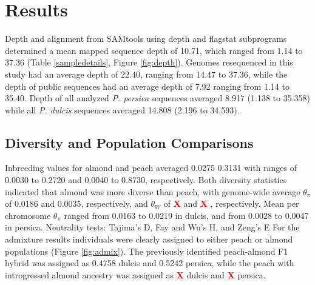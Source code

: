 \documentclass[12pt]{article}
\newcommand{\X}{\textcolor{red}{\bf X }}
\begin{document}
%
%
\section*{Results}

Depth and alignment from SAMtools using depth and flagstat subprograms \citep{li2009sequence} determined a mean mapped sequence depth of 10.71, which ranged from 1.14 to 37.36 (Table \ref{sampledetails}, Figure \ref{fig:depth}). 
%
Genomes resequenced in this study had an average depth of 22.40, ranging from 14.47 to 37.36, while the depth of public sequences had an average depth of 7.92 ranging from 1.14 to 35.40.
%
Depth of all analyzed \emph{P. persica} sequences averaged 8.917 (1.138 to 35.358) while all \emph{P. dulcis} sequences averaged 14.808 (2.196 to 34.593).
%
\subsection*{Diversity and Population Comparisons}

Inbreeding values for almond and peach averaged 0.0275 0.3131 with ranges of 0.0030 to 0.2720 and 0.0040 to 0.8730, respectively.
%
Both diversity statistics indicated that almond was more diverse than peach, with genome-wide average $\theta_{\pi}$ of 0.0186 and 0.0035, respectively, and $\theta_{W}$ of \X and \X, respectively.
%
Mean per chromosome $\theta_{\pi}$ ranged from 0.0163 to 0.0219 in dulcis, and from 0.0028 to 0.0047 in persica.
%
Neutrality tests: Tajima's D, Fay and Wu's H, and Zeng's E
%
For the admixture results individuals were clearly assigned to either peach or almond populations (Figure \ref{fig:admix}). 
%
The previously identified peach-almond F1 hybrid was assigned as 0.4758 dulcis and 0.5242 persica, while the peach with introgressed almond ancestry was assigned as \X dulcis and \X persica.
%
\end{document}
